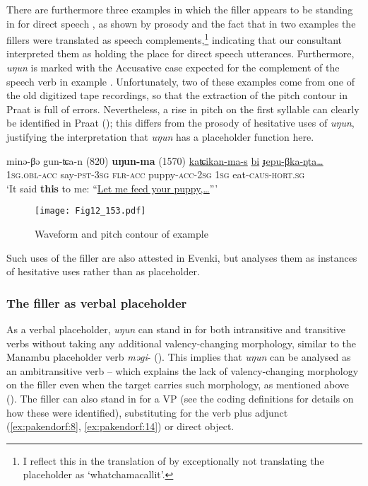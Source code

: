 \documentclass[output=paper]{langscibook}
\begin{document}
There are furthermore three examples in which the filler appears to be standing in for direct speech , as shown by prosody and the fact that in two examples the fillers were translated as speech complements,\footnote{I reflect this in the translation of  by exceptionally not translating the placeholder as ‘whatchamacallit’.} indicating that our consultant interpreted them as holding the place for direct speech utterances. Furthermore, \textit{uŋun} is marked with the Accusative case expected for the complement of the speech verb in example . Unfortunately, two of these examples come from one of the old digitized tape recordings, so that the extraction of the pitch contour in Praat is full of errors. Nevertheless, a rise in pitch on the first syllable can clearly be identified in Praat (); this differs from the prosody of hesitative uses of \textit{uŋun}, justifying the interpretation that \textit{uŋun} has a placeholder function here. 


\ea \label{ex:pakendorf:31}
\gll minə-βə
	gun-ʨa-n
	\textup{(820)}
	\textbf{uŋun-ma}
	\textup{(1570)}
	\uline{kaʨikan-ma-s}
	\uline{bi}
	\uline{ɟepu-βka-ŋta…}\\
     \textsc{1sg.obl-acc}
     say-\textsc{pst-3sg}
     {}
     \textsc{flr-acc}
     {}
     puppy-\textsc{acc-2sg}
     \textsc{1sg}
     eat-\textsc{caus-hort.sg}\\
\glt ‘It said \textbf{this} to me: “\uline{Let me feed your puppy,…}”’ 
\z

\begin{figure}
\texttt{[image: Fig12\_153.pdf]}
\caption{Waveform and pitch contour of example }
\label{fig:pakendorf:12}
\end{figure}

Such uses of the filler are also attested in Evenki, but  \citet[207]{Klyachko2022} analyses them as instances of hesitative uses rather than as placeholder.

\subsubsection{The filler as verbal placeholder}
\label{sec:pakendorf:4.1.5}
As a verbal placeholder, \textit{uŋun} can stand in for both intransitive  and transitive  verbs without taking any additional valency-changing morphology, similar to the Manambu placeholder verb \textit{məgi}- (\citealt[399--400, 575]{Aikhenvald2008}). This implies that \textit{uŋun} can be analysed as an ambitransitive verb – which explains the lack of valency-changing morphology on the filler even when the target carries such morphology, as mentioned above (). The filler can also stand in for a VP (see the coding definitions for details on how these were identified), substituting for the verb plus adjunct (\ref{ex:pakendorf:8}, \ref{ex:pakendorf:14}) or direct object.
\end{document}
